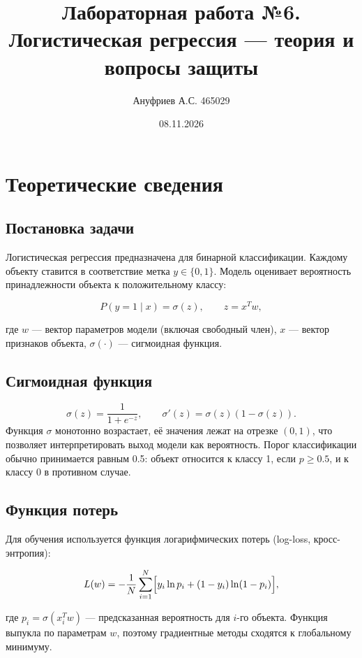 \documentclass[12pt,a4paper]{article}
\title{Лабораторная работа №6. Логистическая регрессия --- теория и вопросы защиты}
\author{Ануфриев А.С. 465029}
\date{08.11.2026}
\begin{document}
\maketitle

\section{Теоретические сведения}

\subsection{Постановка задачи}
Логистическая регрессия предназначена для бинарной классификации. Каждому объекту ставится в соответствие метка \(y \in \{0,1\}\). Модель оценивает вероятность принадлежности объекта к положительному классу:

\begin{equation}
P(y=1 \mid x) = \sigma(z), \qquad z = x^T w,
\end{equation}

где \(w\) --- вектор параметров модели (включая свободный член), \(x\) --- вектор признаков объекта, \(\sigma(\cdot)\) --- сигмоидная функция.

\subsection{Сигмоидная функция}
\begin{equation}
\sigma(z) = \frac{1}{1 + e^{-z}}, \qquad \sigma'(z) = \sigma(z)(1-\sigma(z)).
\end{equation}
Функция \(\sigma\) монотонно возрастает, её значения лежат на отрезке \((0,1)\), что позволяет интерпретировать выход модели как вероятность. Порог классификации обычно принимается равным 0.5: объект относится к классу 1, если \(p \ge 0.5\), и к классу 0 в противном случае.

\subsection{Функция потерь}
Для обучения используется функция логарифмических потерь (log-loss, кросс-энтропия):

\begin{equation}
L(w) = -\frac{1}{N}\sum_{i=1}^{N}\Bigl[y_i\ln p_i + (1-y_i)\ln(1-p_i)\Bigr],
\end{equation}

где \(p_i = \sigma(x_i^T w)\) --- предсказанная вероятность для \(i\)-го объекта. Функция выпукла по параметрам \(w\), поэтому градиентные методы сходятся к глобальному минимуму.
\end{document}
